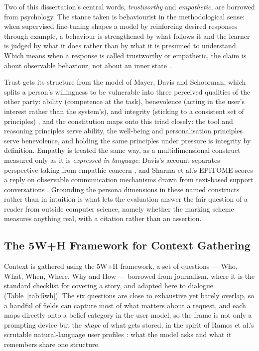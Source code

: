 Two of this dissertation's central words, \emph{trustworthy} and \emph{empathetic}, are borrowed from psychology. The stance taken is behaviourist in the methodological sense: when supervised fine-tuning shapes a model by reinforcing desired responses through example, a behaviour is strengthened by what follows it and the learner is judged by what it does rather than by what it is presumed to understand. Which means when a response is called trustworthy or empathetic, the claim is about observable behaviour, not about an inner state \cite{skinner1953sciencehumanbehavior}.

Trust gets its structure from the model of Mayer, Davis and Schoorman, which splits a person's willingness to be vulnerable into three perceived qualities of the other party: ability (competence at the task), benevolence (acting in the user's interest rather than the system's), and integrity (sticking to a consistent set of principles) \cite{mayer1995integrativetrust}, and the constitution maps onto this triad closely: the tool and reasoning principles serve ability, the well-being and personalisation principles serve benevolence, and holding the same principles under pressure is integrity by definition. Empathy is treated the same way, as a multidimensional construct measured only as it is \emph{expressed in language}: Davis's account separates perspective-taking from empathic concern \cite{davis1983empathyiri}, and Sharma et al.'s EPITOME scores a reply on observable communication mechanisms drawn from text-based support conversations \cite{sharma2020computationalapproachunderstandingempathy}. Grounding the persona dimensions in these named constructs rather than in intuition is what lets the evaluation answer the fair question of a reader from outside computer science, namely whether the marking scheme measures anything real, with a citation rather than an assertion.


\subsection{The 5W+H Framework for Context Gathering}
\label{subsec:the-5w-h-framework-for-context-gathering}

Context is gathered using the 5W+H framework, a set of questions --- Who, What, When, Where, Why and How --- borrowed from journalism, where it is the standard checklist for covering a story, and adapted here to dialogue (Table~\ref{tab:5wh}). The six questions are close to exhaustive yet barely overlap, so a handful of fields can capture most of what matters about a request, and each maps directly onto a belief category in the user model, so the frame is not only a prompting device but the \emph{shape} of what gets stored, in the spirit of Ramos et al.'s scrutable natural-language user profiles \cite{ramos2024transparentscrutablerecommendationsusing}: what the model asks and what it remembers share one structure.

